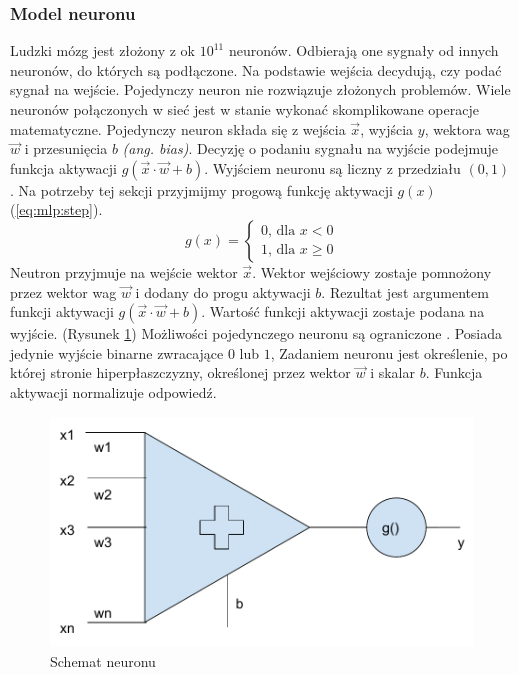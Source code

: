 \documentclass[a4paper,12pt,twoside,openany]{report}
\newcommand{\ang}[1]{\textit{(ang. #1)}}
\newcommand{\Rys}[1]{(Rysunek \ref{#1})}
\newcommand{\Eq}[1]{(\ref{#1})}
\begin{document}
\subsubsection{Model neuronu}
Ludzki mózg jest złożony z ok $10^{11}$ neuronów.
Odbierają one sygnały od innych neuronów, do których są podłączone.
Na podstawie wejścia decydują, czy podać sygnał na wejście.
Pojedynczy neuron nie rozwiązuje złożonych problemów.
Wiele neuronów połączonych w sieć jest w stanie wykonać skomplikowane operacje matematyczne.
Pojedynczy neuron składa się z wejścia $\vec{x}$, wyjścia $y$, wektora wag $\vec{w}$ i przesunięcia $b$ \ang{bias}.
Decyzję o podaniu sygnału na wyjście podejmuje funkcja aktywacji $g(\vec{x} \cdot \vec{w} + b)$.
Wyjściem neuronu są liczny z przedziału $(0, 1)$.
Na potrzeby tej sekcji przyjmijmy progową funkcję aktywacji $g(x)$ \Eq{eq:mlp:step}.
\begin{equation}
	\label{eq:mlp:step}
g(x)={\begin{cases}0{\text{, dla }}x<0\\1{\text{, dla }}x\geq 0\end{cases}}
\end{equation}
Neutron przyjmuje na wejście wektor $\vec{x}$.
Wektor wejściowy zostaje pomnożony przez wektor wag $\vec{w}$ i dodany do progu aktywacji $b$.
Rezultat jest argumentem funkcji aktywacji  $g(\vec{x} \cdot \vec{w} + b)$.
Wartość funkcji aktywacji zostaje podana na wyjście. \Rys{rys:mlp:neuron}
Możliwości pojedynczego neuronu są ograniczone \cite{Jeon2018}.
Posiada jedynie wyjście binarne zwracające $0$ lub $1$, 
Zadaniem neuronu jest określenie, po której stronie hiperpłaszczyzny, 
określonej przez wektor $\vec w$ i skalar $b$.
Funkcja aktywacji normalizuje odpowiedź.
\begin{figure}[h]
	\centering
	\includegraphics[width=\textwidth]{neuron}
	\caption{Schemat neuronu}
	\label{rys:mlp:neuron}
\end{figure}
\end{document}
